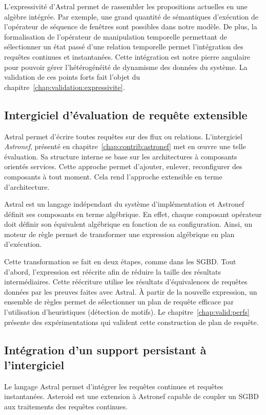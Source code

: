 L'expressivité d'Astral permet de rassembler les propositions actuelles en une algèbre intégrée. Par exemple, une grand quantité de sémantiques d'exécution de l'opérateur de séquence de fenêtres sont possibles dans notre modèle. De plus, la formalisation de l'opérateur de manipulation temporelle permettant de sélectionner un état passé d'une relation temporelle permet l'intégration des requêtes continues et instantanées. Cette intégration est notre pierre angulaire pour pouvoir gérer l'hétérogénéité de dynamisme des données du système. La validation de ces points forts fait l'objet du chapitre~\ref{chap:validation:expressivite}.

\subsection{Intergiciel d'évaluation de requête extensible}
Astral permet d'écrire toutes requêtes sur des flux ou relations. L'intergiciel \textit{Astronef}, présenté en chapitre~\ref{chap:contrib:astronef} met en œuvre une telle évaluation. Sa structure interne se base sur les architectures à composants orientés services. Cette approche permet d'ajouter, enlever, reconfigurer des composants à tout moment. Cela rend l'approche extensible en terme d'architecture.

Astral est un langage indépendant du système d'implémentation et Astronef définit ses composants en terme algébrique. En effet, chaque composant opérateur doit définir son équivalent algébrique en fonction de sa configuration. Ainsi, un moteur de règle permet de transformer une expression algébrique en plan d'exécution.

Cette transformation se fait en deux étapes, comme dans les SGBD. Tout d'abord, l'expression est réécrite afin de réduire la taille des résultats intermédiaires. Cette réécriture utilise les résultats d'équivalences de requêtes données par les preuves faites avec Astral. À partir de la nouvelle expression, un ensemble de règles permet de sélectionner un plan de requête efficace par l'utilisation d'heuristiques (détection de motifs). Le chapitre~\ref{chap:valid:perfs} présente des expérimentations qui valident cette construction de plan de requête.

\subsection{Intégration d'un support persistant à l'intergiciel}
Le langage Astral permet d'intégrer les requêtes continues et requêtes instantanées. Asteroid est une extension à Astronef capable de coupler un SGBD aux traitements des requêtes continues.

